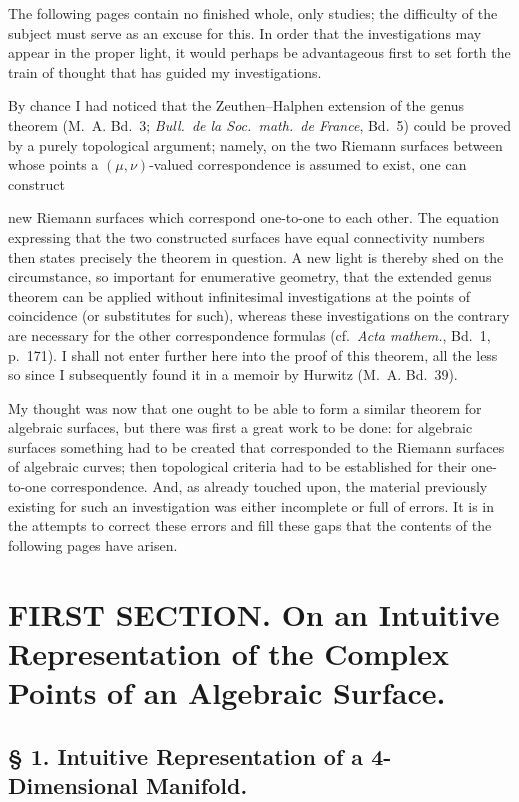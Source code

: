 \documentclass{article}
\begin{document}
The following pages contain no finished whole, only studies; the difficulty of the subject must serve as an excuse for this. In order that the investigations may appear in the proper light, it would perhaps be advantageous first to set forth the train of thought that has guided my investigations.

By chance I had noticed that the Zeuthen--Halphen extension of the genus theorem (M.~A. Bd.~3; \emph{Bull.\ de la Soc.\ math.\ de France}, Bd.~5) could be proved by a purely topological argument; namely, on the two Riemann surfaces between whose points a $(\mu, \nu)$-valued correspondence is assumed to exist, one can construct

new Riemann surfaces which correspond one-to-one to each other. The equation expressing that the two constructed surfaces have equal connectivity numbers then states precisely the theorem in question. A new light is thereby shed on the circumstance, so important for enumerative geometry, that the extended genus theorem can be applied without infinitesimal investigations at the points of coincidence (or substitutes for such), whereas these investigations on the contrary are necessary for the other correspondence formulas (cf.\ \emph{Acta mathem.}, Bd.~1, p.~171). I shall not enter further here into the proof of this theorem, all the less so since I subsequently found it in a memoir by Hurwitz (M.~A. Bd.~39).

My thought was now that one ought to be able to form a similar theorem for algebraic surfaces, but there was first a great work to be done: for algebraic surfaces something had to be created that corresponded to the Riemann surfaces of algebraic curves; then topological criteria had to be established for their one-to-one correspondence. And, as already touched upon, the material previously existing for such an investigation was either incomplete or full of errors. It is in the attempts to correct these errors and fill these gaps that the contents of the following pages have arisen.

\section*{FIRST SECTION. On an Intuitive Representation of the Complex Points of an Algebraic Surface.}

\subsection*{§ 1. Intuitive Representation of a 4-Dimensional Manifold.}
\end{document}
